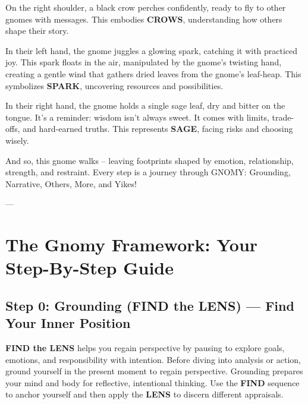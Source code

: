 \documentclass{article}
\begin{document}
On the right shoulder, a black crow perches confidently, ready to fly to other gnomes with messages. This embodies \textbf{CROWS}, understanding how others shape their story.

In their left hand, the gnome juggles a glowing spark, catching it with practiced joy. This spark floats in the air, manipulated by the gnome's twisting hand, creating a gentle wind that gathers dried leaves from the gnome's leaf-heap. This symbolizes \textbf{SPARK}, uncovering resources and possibilities.

In their right hand, the gnome holds a single sage leaf, dry and bitter on the tongue. It's a reminder: wisdom isn't always sweet. It comes with limits, trade-offs, and hard-earned truths. This represents \textbf{SAGE}, facing risks and choosing wisely.

And so, this gnome walks -- leaving footprints shaped by emotion, relationship, strength, and restraint. Every step is a journey through GNOMY: Grounding, Narrative, Others, More, and Yikes!

---

\section{The Gnomy Framework: Your Step-By-Step Guide}

\subsection{Step 0: Grounding (FIND the LENS) — Find Your Inner Position}
\textbf{FIND the LENS} helps you regain perspective by pausing to explore goals, emotions, and responsibility with intention. Before diving into analysis or action, ground yourself in the present moment to regain perspective. Grounding prepares your mind and body for reflective, intentional thinking. Use the \textbf{FIND} sequence to anchor yourself and then apply the \textbf{LENS} to discern different appraisals.
\end{document}

